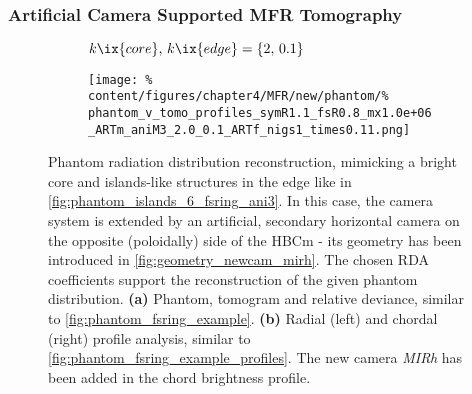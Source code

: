             \subsubsection*{Artificial Camera Supported MFR Tomography}%
%
                \begin{figure}[t]%
                    \centering%
                    \begin{subfigure}{\textwidth}%
                        \centering%
                        \caption{$k\ix{core},\,k\ix{edge}=\left\{2,\,0.1\right\}$}%
                    \end{subfigure}%
                    \newline%
                    \begin{subfigure}{\textwidth}%
                        \centering%
                        \texttt{[image: \%
                            content/figures/chapter4/MFR/new/phantom/\%
                            phantom\_v\_tomo\_profiles\_symR1.1\_fsR0.8\_mx1.0e+06\_ARTm\_aniM3\_2.0\_0.1\_ARTf\_nigs1\_times0.11.png]}%
                        \caption{}%
                    \end{subfigure}%
                    \caption{Phantom radiation distribution reconstruction, mimicking a bright core and islands-like structures in the edge like in \cref{fig:phantom_islands_6_fsring_ani3}. In this case, the camera system is extended by an artificial, secondary horizontal camera on the opposite (poloidally) side of the HBCm - its geometry has been introduced in \cref{fig:geometry_newcam_mirh}. The chosen RDA coefficients support the reconstruction of the given phantom distribution. \textbf{(a)} Phantom, tomogram and relative deviance, similar to \cref{fig:phantom_fsring_example}. \textbf{(b)} Radial (left) and chordal (right) profile analysis, similar to \cref{fig:phantom_fsring_example_profiles}. The new camera \textit{MIRh} has been added in the chord brightness profile.}\label{fig:phantom_islands_6_fsring_ARTm}%
                \end{figure}%
%
